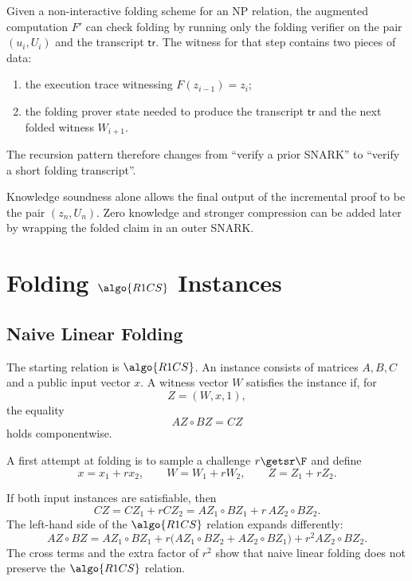 \documentclass[11pt]{article}
\begin{document}
Given a non-interactive folding scheme for an NP relation, the augmented
computation $F'$ can check folding by running only the folding verifier on the
pair $(u_i,U_i)$ and the transcript $\mathsf{tr}$.  The witness for that step
contains two pieces of data:
\begin{enumerate}
  \item the execution trace witnessing $F(z_{i-1}) = z_i$;
  \item the folding prover state needed to produce the transcript
        $\mathsf{tr}$ and the next folded witness $W_{i+1}$.
\end{enumerate}

The recursion pattern therefore changes from ``verify a prior SNARK'' to
``verify a short folding transcript''.

\begin{remark}
Knowledge soundness alone allows the final output of the incremental proof to
be the pair $(z_n, U_n)$.  Zero knowledge and stronger compression can be added
later by wrapping the folded claim in an outer SNARK.
\end{remark}

\section{Folding \texorpdfstring{$\algo{R1CS}$}{R1CS} Instances}

\subsection{Naive Linear Folding}

The starting relation is $\algo{R1CS}$.  An instance consists of matrices
$A,B,C$ and a public input vector $x$.  A witness vector $W$ satisfies the
instance if, for
\[
  Z = (W,x,1),
\]
the equality
\[
  A Z \circ B Z = C Z
\]
holds componentwise.

A first attempt at folding is to sample a challenge $r \getsr \F$ and define
\[
  x = x_1 + r x_2,
  \qquad
  W = W_1 + r W_2,
  \qquad
  Z = Z_1 + r Z_2.
\]

If both input instances are satisfiable, then
\[
  C Z = C Z_1 + r C Z_2
      = A Z_1 \circ B Z_1 + r\, A Z_2 \circ B Z_2.
\]
The left-hand side of the $\algo{R1CS}$ relation expands differently:
\[
  A Z \circ B Z
  =
  A Z_1 \circ B Z_1
  + r \bigl(A Z_1 \circ B Z_2 + A Z_2 \circ B Z_1\bigr)
  + r^2 A Z_2 \circ B Z_2.
\]
The cross terms and the extra factor of $r^2$ show that naive linear folding
does not preserve the $\algo{R1CS}$ relation.
\end{document}
